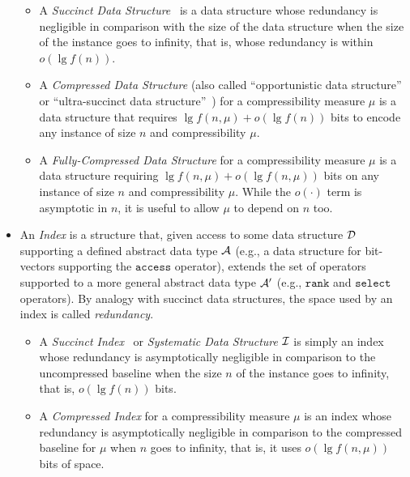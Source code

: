 \documentclass[a4paper,10pt]{article}
\newcommand{\access}{\ensuremath{\texttt{access}}}
\newcommand{\rank}{\ensuremath{\texttt{rank}}}
\newcommand{\select}{\ensuremath{\texttt{select}}}
\newcommand{\abstractDataType}{\ensuremath{{\cal A}}}
\begin{document}
\begin{itemize}
\begin{itemize}
\item A \emph{Succinct Data Structure}~\cite{1989-FOCS-SpaceEfficientStaticTreesAndGraphs-Jacobson} is a data structure whose redundancy is negligible in comparison with the size of the data structure when the size of the instance goes to infinity, that is, whose redundancy is within $o(\lg f(n))$.
\item A {\em Compressed Data Structure} (also called ``opportunistic data structure''~\cite{2004-Algoritmica-EngineeringAlightweightSuffixArrayConstructionAlgorithm-ManziniFerragina} or ``ultra-succinct data structure''~\cite{2007-SODA-UltraSuccinctRepresentationOfORderedTrees-JanssonSadakaneSung}) for a compressibility measure $\mu$ is a data structure that requires $\lg f(n,\mu) + o(\lg f(n))$ bits to encode any instance of size $n$ and compressibility $\mu$.
\item A {\em Fully-Compressed Data Structure} for a compressibility measure $\mu$ is a data structure requiring $\lg f(n,\mu) + o(\lg f(n,\mu))$ bits on any instance of size $n$ and compressibility $\mu$. While the $o(\cdot)$ term is asymptotic in $n$, it is useful to allow $\mu$ to depend on $n$ too.
\end{itemize}

\item An \emph{Index} is a structure that, given access to some data structure $\cal D$ supporting a defined abstract data type $\abstractDataType$ (e.g., a data structure for bit-vectors supporting the {\access} operator), extends the set of operators supported to a more general abstract data type $\abstractDataType'$ (e.g., {\rank} and {\select} operators).  By analogy with succinct data structures, the space used by an index is called \emph{redundancy}.
  \begin{itemize}
\item A \emph{Succinct Index}~\cite{2011-TALG-SuccinctIndexesForStringsBinaryRelationsAndMultiLabeledTrees-BarbayHeMunroRao} or \emph{Systematic Data Structure} $\cal I$ is simply an index whose redundancy is asymptotically negligible in comparison to the uncompressed baseline when the size $n$ of the instance goes to infinity, that is, $o(\lg f(n))$ bits.

\item A \emph{Compressed Index} for a compressibility measure $\mu$ is an index whose redundancy is asymptotically negligible in comparison to the compressed baseline for $\mu$ when $n$ goes to infinity, that is, it uses $o(\lg f(n,\mu))$ bits of space.
  \end{itemize}

\end{itemize}
\end{document}
